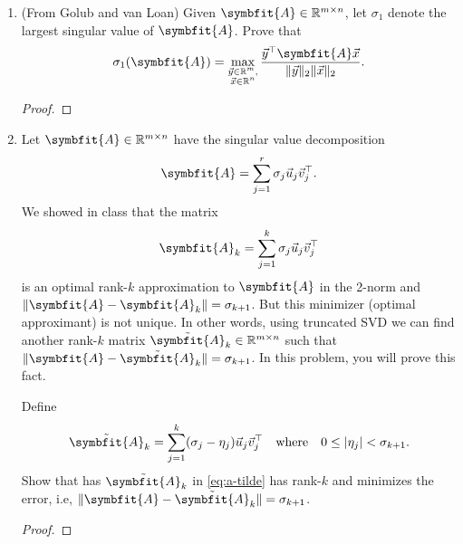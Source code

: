 \documentclass{article}
\theoremstyle{definition}
\newtheorem*{answer}{Answer}
\newcommand{\reals} {\mathbb{R}}
\newcommand{\mat}[1]{\symbfit{#1}}
\begin{document}
\begin{enumerate}[leftmargin=\labelsep]
\begin{enumerate}
\begin{answer}
\begin{align*}
\begin{bmatrix}
					                                                                    0.6  & -0.8 \\
					                                                                    -0.8 & -0.6 \\
				                                                                    \end{bmatrix}^\top,                       \\
				            \|\mat{A} - \mat{A}_1\|_2 & = 3.
			            \end{align*}
		            \end{answer}
	      \end{enumerate}

	\item (From Golub and van Loan) Given \(\mat{A} \in \reals^{m \times n}\), let \(\sigma_1\) denote the largest singular value of \(\mat{A}\). Prove that
	      \[
		      \sigma_1(\mat{A}) = \max_{\substack{\vec{y} \in \reals^m, \\ \vec{x} \in \reals^n}} \frac{\vec{y}^\top \mat{A} \vec{x}}{\|\vec{y}\|_2\|\vec{x}\|_2}.
	      \]
	      \begin{proof}

	      \end{proof}

	\item Let \(\mat{A} \in \reals^{m \times n}\) have the singular value decomposition
	      \[
		      \mat{A} = \sum_{j = 1}^r \sigma_j \vec{u}_j\vec{v}_j^\top.
	      \]
	      We showed in class that the matrix
	      \[
		      \mat{A}_k = \sum_{j = 1}^k \sigma_j \vec{u}_j\vec{v}_j^\top
	      \]
	      is an optimal rank-\(k\) approximation to \(\mat{A}\) in the 2-norm and \(\|\mat{A} - \mat{A}_k\| = \sigma_{k+1}\). But this minimizer (optimal approximant) is not unique. In other words, using truncated SVD we can find another rank-\(k\) matrix \(\tilde{\mat{A}}_k \in \reals^{m\times n}\) such that \(\|\mat{A} - \tilde{\mat{A}}_k\| = \sigma_{k+1}\). In this problem, you will prove this fact.

	      Define
	      \begin{equation}
		      \tilde{\mat{A}}_k = \sum_{j = 1}^k(\sigma_j - \eta_j)\vec{u}_j\vec{v}_j^\top \quad \text{where} \quad 0 \leq |\eta_j| < \sigma_{k + 1}. \label{eq:a-tilde}
	      \end{equation}
	      Show that has \(\tilde{\mat{A}}_k\) in \eqref{eq:a-tilde} has rank-\(k\) and minimizes the error, i.e, \(\|\mat{A} - \tilde{\mat{A}}_k\| = \sigma_{k+1}\).
	      \begin{proof}


\end{proof}
\end{enumerate}
\end{document}
